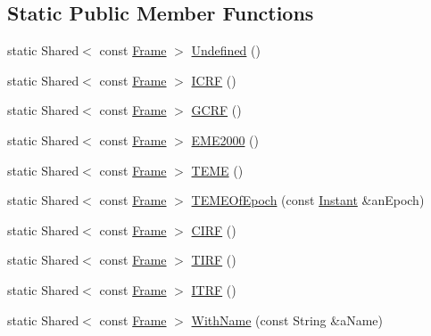 \subsection*{Static Public Member Functions}
\begin{DoxyCompactItemize}
\item 
static Shared$<$ const \hyperlink{classlibrary_1_1physics_1_1coord_1_1_frame}{Frame} $>$ \hyperlink{classlibrary_1_1physics_1_1coord_1_1_frame_aed834a54cd63338b3d9cc4bee2989d9d}{Undefined} ()
\item 
static Shared$<$ const \hyperlink{classlibrary_1_1physics_1_1coord_1_1_frame}{Frame} $>$ \hyperlink{classlibrary_1_1physics_1_1coord_1_1_frame_a7c325ecdb25f617babb9bfcf2d0f56e5}{I\+C\+RF} ()
\item 
static Shared$<$ const \hyperlink{classlibrary_1_1physics_1_1coord_1_1_frame}{Frame} $>$ \hyperlink{classlibrary_1_1physics_1_1coord_1_1_frame_af69afe3a03044d0c8245fd814dc2e3ce}{G\+C\+RF} ()
\item 
static Shared$<$ const \hyperlink{classlibrary_1_1physics_1_1coord_1_1_frame}{Frame} $>$ \hyperlink{classlibrary_1_1physics_1_1coord_1_1_frame_a16840fb31ca3fdaff3465a714b486683}{E\+M\+E2000} ()
\item 
static Shared$<$ const \hyperlink{classlibrary_1_1physics_1_1coord_1_1_frame}{Frame} $>$ \hyperlink{classlibrary_1_1physics_1_1coord_1_1_frame_a1c59f635fe7a36f416994c83533bfb40}{T\+E\+ME} ()
\item 
static Shared$<$ const \hyperlink{classlibrary_1_1physics_1_1coord_1_1_frame}{Frame} $>$ \hyperlink{classlibrary_1_1physics_1_1coord_1_1_frame_acadb0a99f334abe26797fd846e1ca22e}{T\+E\+M\+E\+Of\+Epoch} (const \hyperlink{classlibrary_1_1physics_1_1time_1_1_instant}{Instant} \&an\+Epoch)
\item 
static Shared$<$ const \hyperlink{classlibrary_1_1physics_1_1coord_1_1_frame}{Frame} $>$ \hyperlink{classlibrary_1_1physics_1_1coord_1_1_frame_a0786e3028527a43e423936989a9cd294}{C\+I\+RF} ()
\item 
static Shared$<$ const \hyperlink{classlibrary_1_1physics_1_1coord_1_1_frame}{Frame} $>$ \hyperlink{classlibrary_1_1physics_1_1coord_1_1_frame_af03b39a76e957c83375cb3439f3d6a5a}{T\+I\+RF} ()
\item 
static Shared$<$ const \hyperlink{classlibrary_1_1physics_1_1coord_1_1_frame}{Frame} $>$ \hyperlink{classlibrary_1_1physics_1_1coord_1_1_frame_aae0930a623efe205c837b167981eec4d}{I\+T\+RF} ()
\item 
static Shared$<$ const \hyperlink{classlibrary_1_1physics_1_1coord_1_1_frame}{Frame} $>$ \hyperlink{classlibrary_1_1physics_1_1coord_1_1_frame_ad4b2b9a19b234d27ea56ea8b21107f9b}{With\+Name} (const String \&a\+Name)

\end{DoxyCompactItemize}
